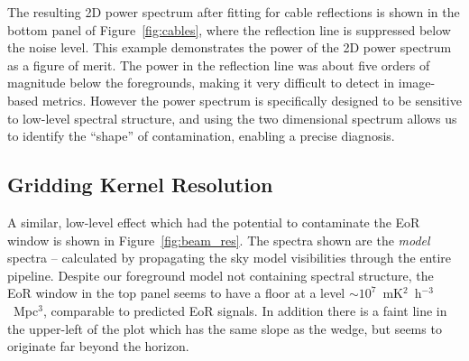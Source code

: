 \documentclass[iop]{emulateapj}
\begin{document}
The resulting 2D power spectrum after fitting for cable reflections is shown in the bottom 
panel of Figure~\ref{fig:cables}, where the reflection line is suppressed below the noise 
level. This example demonstrates the power of the 2D power spectrum as a figure of merit. 
The power in the reflection line was about five orders of magnitude below the foregrounds, 
making it very difficult to detect in image-based metrics. However the power spectrum is 
specifically designed to be sensitive to low-level spectral structure, and using the two 
dimensional spectrum allows us to identify the ``shape'' of contamination, enabling a 
precise diagnosis.

\subsection{Gridding Kernel Resolution}
A similar, low-level effect which had the potential to contaminate the EoR window is shown 
in Figure~\ref{fig:beam_res}. The spectra shown are the \emph{model} spectra -- calculated 
by propagating the sky model visibilities through the entire pipeline. Despite our foreground 
model not containing spectral structure, the EoR window in the top panel seems to have a 
floor at a level $\sim 10^7$~mK$^2$~h$^{-3}$~Mpc$^3$, comparable to predicted EoR 
signals. In addition there is a faint line in the upper-left of the plot which has the same slope 
as the wedge, but seems to originate far beyond the horizon.
\end{document}
